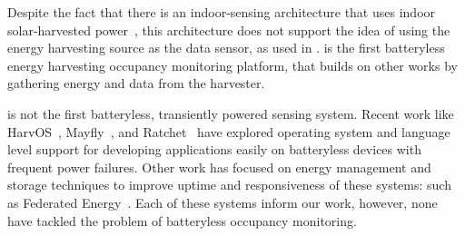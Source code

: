 Despite the fact that there is an indoor-sensing architecture that uses indoor solar-harvested power~\cite{campbell2014energy}, this architecture does not support the idea of using the energy harvesting source as the data sensor, as used in \sysname.
\sysname is the first batteryless energy harvesting occupancy monitoring platform, that builds on other works by gathering energy and data from the harvester.

\sysname is not the first batteryless, transiently powered sensing system.
Recent work like HarvOS~\cite{bhatti2017harvos}, Mayfly~\cite{hester2017mayfly}, and Ratchet~\cite{van2016intermittent} have explored operating system and language level support for developing applications easily on batteryless devices with frequent power failures.
Other work has focused on energy management and storage techniques to improve uptime and responsiveness of these systems: such as Federated Energy~\cite{jhester:ufop:sensys}.
Each of these systems inform our work, however, none have tackled the problem of batteryless occupancy monitoring.

